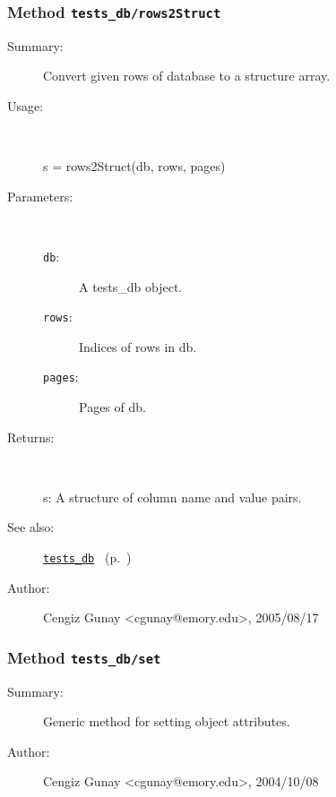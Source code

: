 \subsubsection[Method \texttt{rows2Struct}]{Method \texttt{tests\_db/rows2Struct}}%
%
\label{ref_tests_db__rows2Struct}%
\hypertarget{ref_tests_db__rows2Struct}{}%
\begin{description}
\item[Summary:]Convert given rows of database to a structure array.
%
\item[Usage:]~%
\begin{lyxcode}%
s = rows2Struct(db, rows, pages)
%
\end{lyxcode}%
%
%
\item[Parameters:]~
\begin{description}%
\item[\texttt{db}:]
 A tests\_db object.
\item[\texttt{rows}:]
 Indices of rows in db.
\item[\texttt{pages}:]
 Pages of db.
\end{description}%
%
\item[Returns:
]~

	s: A structure of column name and value pairs.
%
%
\item[See also:]%
\hyperlink{ref_tests_db}{\texttt{tests\_db}}%
\ (p.~\pageref{ref_tests_db})%
%
%
\item[Author:]%
Cengiz Gunay <cgunay@emory.edu>, 2005/08/17
%
\end{description}
\methodline%
\subsubsection[Method \texttt{set}]{Method \texttt{tests\_db/set}}%
%
\label{ref_tests_db__set}%
\hypertarget{ref_tests_db__set}{}%
\begin{description}
\item[Summary:]Generic method for setting object attributes.
%
%
%
%
%
%
%
\item[Author:]%
Cengiz Gunay <cgunay@emory.edu>, 2004/10/08
%
\end{description}
\methodline%
